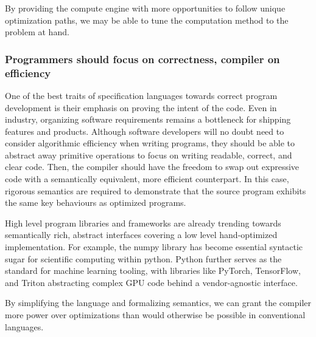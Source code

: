 \documentclass{article}
\begin{document}
By providing the compute engine with more opportunities to follow unique optimization paths, we may be able to tune the computation method to the problem at hand.


\subsubsection{Programmers should focus on correctness, compiler on efficiency}
One of the best traits of specification languages towards correct program development is their emphasis on proving the intent of the code. Even in industry, organizing software requirements remains a bottleneck for shipping features and products. Although software developers will no doubt need to consider algorithmic efficiency when writing programs, they should be able to abstract away primitive operations to focus on writing readable, correct, and clear code. Then, the compiler should have the freedom to swap out expressive code with a semantically equivalent, more efficient counterpart. In this case, rigorous semantics are required to demonstrate that the source program exhibits the same key behaviours as optimized programs.

High level program libraries and frameworks are already trending towards semantically rich, abstract interfaces covering a low level hand-optimized implementation. For example, the numpy library has become essential syntactic sugar for scientific computing within python. Python further serves as the standard for machine learning tooling, with libraries like PyTorch, TensorFlow, and Triton abstracting complex GPU code behind a vendor-agnostic interface.

By simplifying the language and formalizing semantics, we can grant the compiler more power over optimizations than would otherwise be possible in conventional languages.
\end{document}

